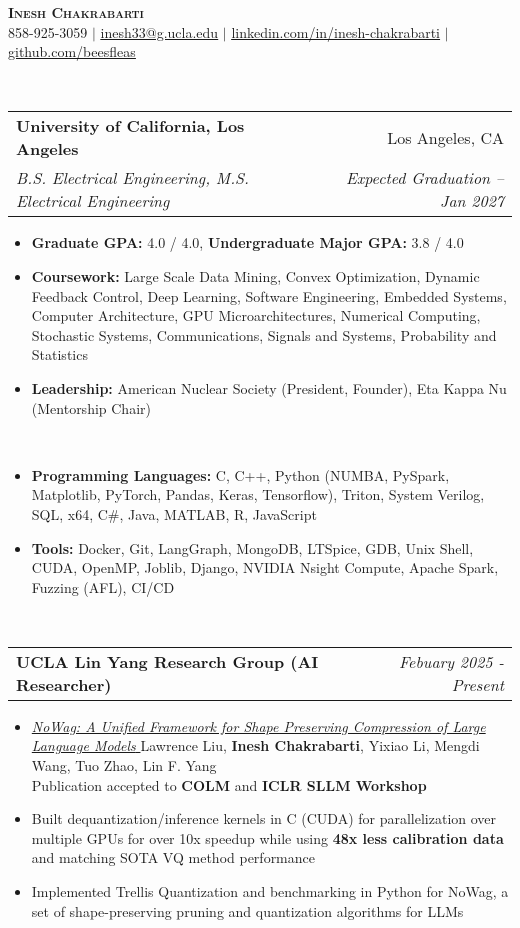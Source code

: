 \documentclass[letterpaper,11pt]{article}
\makeatletter
\newcommand{\resitem}[1]{\item #1 \vspace{-8pt}}
\newcommand{\resheading}[1]{\vspace{8pt}{\Large \textbf{#1}}\\\vspace{-8pt}\hrulefill}
\newcommand{\ressubheading}[4]{\vspace{3pt}
\begin{tabular*}{7.0in}{l@{\cftdotfill{\cftsecdotsep}\extracolsep{\fill}}r}
		\textbf{#1} & #2 \\
		\textit{#3} & \textit{#4} \\
\end{tabular*}\vspace{-6pt}}
\newcommand{\ressubheadingsmol}[2]{\vspace{1pt}
\begin{tabular*}{7.0in}{l@{\cftdotfill{\cftsecdotsep}\extracolsep{\fill}}r}
		\textbf{#1} & \textit{#2} \\
\end{tabular*}\vspace{-6pt}}
\makeatother
\begin{document}
    
\begin{center}
    \textbf{\LARGE \scshape Inesh Chakrabarti} \\ \vspace{1pt}
    \small 858-925-3059 $|$ \href{mailto:inesh33@g.ucla.edu}{\underline{inesh33@g.ucla.edu}} $|$ 
    \href{https://www.linkedin.com/in/inesh-chakrabarti-878602183}{\underline{linkedin.com/in/inesh-chakrabarti}} $|$
    \href{https://github.com/beesfleas}{\underline{github.com/beesfleas}}
\end{center}

\resheading{Education}
\ressubheading{University of California, Los Angeles}{Los Angeles, CA}{B.S. Electrical Engineering, M.S. Electrical Engineering}{Expected Graduation -- Jan 2027}
\begin{itemize}
	\resitem{\textbf{Graduate GPA:} 4.0 / 4.0, \textbf{Undergraduate Major GPA:} 3.8 / 4.0}
	\resitem{\textbf{Coursework:} Large Scale Data Mining, Convex Optimization, Dynamic Feedback Control, Deep Learning, Software Engineering, Embedded Systems, Computer Architecture, GPU Microarchitectures, Numerical Computing, Stochastic Systems,  Communications, Signals and Systems, Probability and Statistics}
    \resitem{\textbf{Leadership:} American Nuclear Society (President, Founder), Eta Kappa Nu (Mentorship Chair)}
\end{itemize}

\resheading{Skills}
\begin{itemize}
\resitem{\textbf{Programming Languages:} C, C++, Python (NUMBA, PySpark, Matplotlib, PyTorch, Pandas, Keras, Tensorflow), Triton, System Verilog, SQL, x64, C\#, Java, MATLAB, R, JavaScript}
\resitem{\textbf{Tools:} Docker, Git, LangGraph, MongoDB, LTSpice, GDB, Unix Shell, CUDA, OpenMP, Joblib, Django, NVIDIA Nsight Compute, Apache Spark, Fuzzing (AFL), CI/CD}
\end{itemize}

\resheading{Experience}
\ressubheadingsmol{UCLA Lin Yang Research Group (AI Researcher)}{Febuary 2025 - Present}{}
\begin{itemize}
  \resitem{\href{https://arxiv.org/abs/2504.14569}{\textit{NoWag: A Unified Framework for Shape Preserving Compression of Large Language Models} 
    } Lawrence Liu, \textbf{Inesh Chakrabarti}, Yixiao Li, Mengdi Wang, Tuo Zhao, Lin F. Yang \\ Publication accepted to \textbf{COLM} and \textbf{ICLR SLLM Workshop}}
    \resitem{Built dequantization/inference kernels in C (CUDA) for parallelization over multiple GPUs for over 10x speedup while using \textbf{48x less calibration data }and matching SOTA VQ method performance}
   \resitem{Implemented Trellis Quantization and benchmarking in Python for NoWag, a set of shape-preserving pruning and quantization algorithms for LLMs}
\end{itemize}
\end{document}

